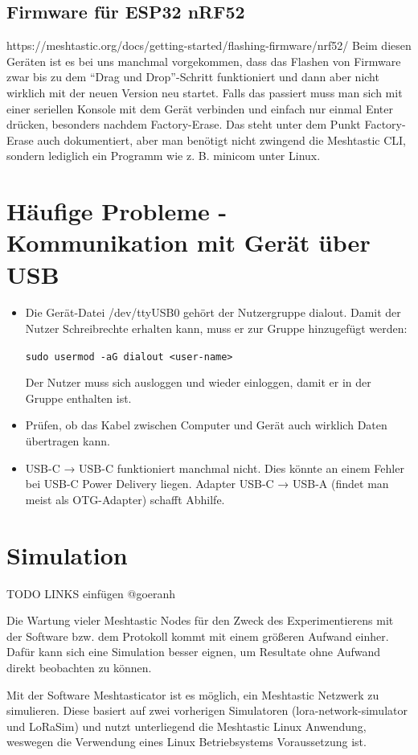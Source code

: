 \documentclass[12pt,a4paper]{article}
\begin{document}
\subsection{Firmware für ESP32 nRF52}
https://meshtastic.org/docs/getting-started/flashing-firmware/nrf52/ Beim diesen Geräten ist es bei uns manchmal vorgekommen, dass das Flashen von Firmware zwar bis zu dem “Drag und Drop”-Schritt funktioniert und dann aber nicht wirklich mit der neuen Version neu startet. Falls das passiert muss man sich mit einer seriellen Konsole mit dem Gerät verbinden und einfach nur einmal Enter drücken, besonders nachdem Factory-Erase. Das steht unter dem Punkt Factory-Erase auch dokumentiert, aber man benötigt nicht zwingend die Meshtastic CLI, sondern lediglich ein Programm wie z. B. minicom unter Linux.

\section{Häufige Probleme - Kommunikation mit Gerät über USB}
\begin{itemize}
	\item Die Gerät-Datei /dev/ttyUSB0 gehört der Nutzergruppe dialout. Damit der Nutzer Schreibrechte erhalten kann, muss er zur Gruppe hinzugefügt werden:
	
	\lstinline{sudo usermod -aG dialout <user-name>}
	
	Der Nutzer muss sich ausloggen und wieder einloggen, damit er in der Gruppe enthalten ist.
	\item Prüfen, ob das Kabel zwischen Computer und Gerät auch wirklich Daten übertragen kann.
	\item USB-C → USB-C funktioniert manchmal nicht. Dies könnte an einem Fehler bei USB-C Power Delivery liegen. Adapter USB-C → USB-A (findet man meist als OTG-Adapter) schafft Abhilfe.
\end{itemize}
\newpage
\section{Simulation}
TODO LINKS einfügen @goeranh

Die Wartung vieler Meshtastic Nodes für den Zweck des Experimentierens mit der Software bzw. dem Protokoll kommt mit einem größeren Aufwand einher. Dafür kann sich eine Simulation besser eignen, um Resultate ohne Aufwand direkt beobachten zu können.

Mit der Software Meshtasticator ist es möglich, ein Meshtastic Netzwerk zu simulieren. Diese basiert auf zwei vorherigen Simulatoren (lora-network-simulator und LoRaSim) und nutzt unterliegend die Meshtastic Linux Anwendung, weswegen die Verwendung eines Linux Betriebsystems Voraussetzung ist.
\end{document}
